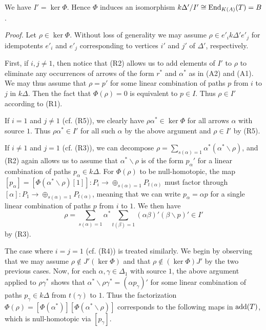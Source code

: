 \documentclass{amsart}
\begin{document}
\begin{propos} We have $I' = \ker \Phi$.  Hence $\Phi$ induces an isomorphism $k\Delta'/I' \cong \mathrm{End}_{K(A)}(T) = B$.
\end{propos}

\noindent
{\it Proof.}  Let $\rho \in \ker \Phi$.  Without loss of generality we may assume $\rho \in e'_i k\Delta' e'_j$ for idempotents $e'_i$ and $e'_j$ corresponding to vertices $i'$ and $j'$ of $\Delta'$, respectively.  %

First, if $i, j \neq 1$, then notice that (R2) allows us to add elements of $I'$ to $\rho$ to eliminate any occurrences of arrows of the form $r^*$ and $\alpha^*$ as in (A2) and (A1).  We may thus assume that $\rho = p'$ for some linear combination of paths $p$ from $i$ to $j$ in $k\Delta$.  Then the fact that $\Phi(\rho) = 0$ is equivalent to $p \in I$.  Thus $\rho \in I'$ according to (R1).

If $i=1$ and $j \neq 1$ (cf. (R5)), we clearly have $\rho \alpha^* \in \ker \Phi$ for all arrows $\alpha$ with source $1$. Thus $\rho \alpha^* \in I'$ for all such $\alpha$ by the above argument  and $\rho \in I'$ by (R5).

If $i \neq 1$ and $j=1$ (cf. (R3)), we can decompose $\rho = \sum_{s(\alpha)=1} \alpha^* (\alpha^* \backslash \rho)$, and (R2) again allows us to assume that $\alpha^* \backslash \rho$ is of the form $p_{\alpha}'$ for a linear combination of paths $p_{\alpha} \in k\Delta$.  For $\Phi(\rho)$ to be null-homotopic, the map $[p_{\alpha}] = [\Phi(\alpha^* \backslash \rho)[1]] : P_i \rightarrow \oplus_{s(\alpha)=1} P_{t(\alpha)}$ must factor through $[\alpha] : P_1 \rightarrow \oplus_{s(\alpha)=1} P_{t(\alpha)}$, meaning that we can write $p_{\alpha} = \alpha p$ for a single linear combination of paths $p$ from $i$ to $1$.  We then have $$\rho = \sum_{s(\alpha)=1} \alpha^* \sum_{t(\beta)=1}(\alpha \beta)' (\beta \backslash p)'  \in I'$$ by (R3).

The case where $i=j=1$ (cf. (R4)) is treated similarly.  We begin by observing that we may assume $\rho \notin J'(\ker \Phi)$ and that $\rho \notin (\ker \Phi)J'$ by the two previous cases.  Now, for each $\alpha, \gamma \in \Delta_1$ with source $1$, the above argument applied to $\rho \gamma^*$ shows that $\alpha^* \backslash \rho \gamma^* = (\alpha p_{\gamma})'$ for some linear combination of paths $p_{\gamma} \in k\Delta$ from $t(\gamma)$ to $1$.  Thus the factorization $\Phi(\rho) = [\Phi(\alpha^*)][\Phi(\alpha^* \backslash \rho)]$ corresponds to the following maps in $\mathrm{add}(T)$, which is null-homotopic via $[p_{\gamma}]$.
\end{document}

